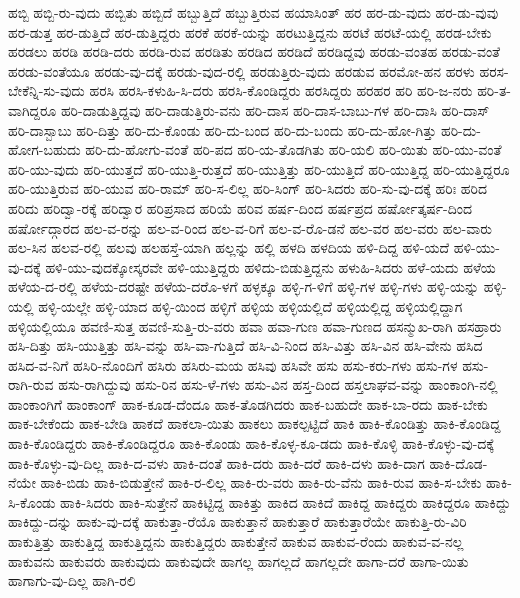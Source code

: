{ಹಬ್ಬಿ
ಹಬ್ಬಿ-ರು-ವುದು
ಹಬ್ಬಿತು
ಹಬ್ಬಿದೆ
ಹಬ್ಬುತ್ತಿದೆ
ಹಬ್ಬುತ್ತಿರುವ
ಹಯಾಸಿಂತ್
ಹರ
ಹರ-ಡು-ವುದು
ಹರ-ಡು-ವುವು
ಹರ-ಡುತ್ತ
ಹರ-ಡುತ್ತಿದೆ
ಹರ-ಡುತ್ತಿದ್ದರು
ಹರಕೆ
ಹರಕೆ-ಯನ್ನು
ಹರಟುತ್ತಿದ್ದನು
ಹರಟೆ
ಹರಟೆ-ಯಲ್ಲಿ
ಹರಡ-ಬೇಕು
ಹರಡಲು
ಹರಡಿ
ಹರಡಿ-ದರು
ಹರಡಿ-ರುವ
ಹರಡಿತು
ಹರಡಿದ
ಹರಡಿದೆ
ಹರಡಿದ್ದವು
ಹರಡು-ವಂತಹ
ಹರಡು-ವಂತೆ
ಹರಡು-ವಂತೆಯೂ
ಹರಡು-ವು-ದಕ್ಕೆ
ಹರಡು-ವುದ-ರಲ್ಲಿ
ಹರಡುತ್ತಿರು-ವುದು
ಹರಡುವ
ಹರಮೋ-ಹನ
ಹರಳು
ಹರಸ-ಬೇಕೆನ್ನಿ-ಸು-ವುದು
ಹರಸಿ
ಹರಸಿ-ಕಳುಹಿ-ಸಿ-ದರು
ಹರಸಿ-ಕೊಂಡಿದ್ದರು
ಹರಸಿದ್ದರು
ಹರಹರ
ಹರಿ
ಹರಿ-ಜ-ನರು
ಹರಿ-ತ-ವಾಗಿದ್ದರೂ
ಹರಿ-ದಾಡುತ್ತಿದ್ದವು
ಹರಿ-ದಾಡುತ್ತಿರು-ವನು
ಹರಿ-ದಾಸ
ಹರಿ-ದಾಸ-ಬಾಬು-ಗಳ
ಹರಿ-ದಾಸಿ
ಹರಿ-ದಾಸ್
ಹರಿ-ದಾಸ್ಬಾಬು
ಹರಿ-ದಿತ್ತು
ಹರಿ-ದು-ಕೊಂಡು
ಹರಿ-ದು-ಬಂದ
ಹರಿ-ದು-ಬಂದು
ಹರಿ-ದು-ಹೋ-ಗಿತ್ತು
ಹರಿ-ದು-ಹೋಗ-ಬಹುದು
ಹರಿ-ದು-ಹೋಗು-ವಂತೆ
ಹರಿ-ಪದ
ಹರಿ-ಯ-ತೊಡಗಿತು
ಹರಿ-ಯಲಿ
ಹರಿ-ಯಿತು
ಹರಿ-ಯು-ವಂತೆ
ಹರಿ-ಯು-ವುದು
ಹರಿ-ಯುತ್ತದೆ
ಹರಿ-ಯುತ್ತಿ-ರುತ್ತದೆ
ಹರಿ-ಯುತ್ತಿತ್ತು
ಹರಿ-ಯುತ್ತಿದೆ
ಹರಿ-ಯುತ್ತಿದ್ದ
ಹರಿ-ಯುತ್ತಿದ್ದರೂ
ಹರಿ-ಯುತ್ತಿರುವ
ಹರಿ-ಯುವ
ಹರಿ-ರಾಮ್
ಹರಿ-ಸ-ಲಿಲ್ಲ
ಹರಿ-ಸಿಂಗ್
ಹರಿ-ಸಿದರು
ಹರಿ-ಸು-ವು-ದಕ್ಕೆ
ಹರಿಃ
ಹರಿದ
ಹರಿದು
ಹರಿದ್ವಾ-ರಕ್ಕೆ
ಹರಿದ್ವಾರ
ಹರಿಪ್ರಸಾದ
ಹರಿಯೆ
ಹರಿವ
ಹರ್ಷ-ದಿಂದ
ಹರ್ಷಪ್ರದ
ಹರ್ಷೋತ್ಕರ್ಷ-ದಿಂದ
ಹರ್ಷೋದ್ಗಾರದ
ಹಲ-ವ-ರನ್ನು
ಹಲ-ವ-ರಿಂದ
ಹಲ-ವ-ರಿಗೆ
ಹಲ-ವ-ರೊ-ಡನೆ
ಹಲ-ವರ
ಹಲ-ವರು
ಹಲ-ವಾರು
ಹಲ-ಸಿನ
ಹಲವ-ರಲ್ಲಿ
ಹಲವು
ಹಲಹಸ್ತೆ-ಯಾಗಿ
ಹಲ್ಲನ್ನು
ಹಲ್ಲಿ
ಹಳದಿ
ಹಳದಿಯ
ಹಳಿ-ದಿದ್ದ
ಹಳಿ-ಯದೆ
ಹಳಿ-ಯು-ವು-ದಕ್ಕೆ
ಹಳಿ-ಯು-ವುದಕ್ಕೋಸ್ಕರವೇ
ಹಳಿ-ಯುತ್ತಿದ್ದರು
ಹಳಿದು-ಬಿಡುತ್ತಿದ್ದನು
ಹಳುಹಿ-ಸಿದರು
ಹಳೆ-ಯದು
ಹಳೆಯ
ಹಳೆಯ-ದ-ರಲ್ಲಿ
ಹಳೆಯ-ದರಷ್ಟೇ
ಹಳೆಯ-ದರೊ-ಳಗೆ
ಹಳ್ಳಕ್ಕೂ
ಹಳ್ಳಿ-ಗ-ಳಿಗೆ
ಹಳ್ಳಿ-ಗಳ
ಹಳ್ಳಿ-ಗಳು
ಹಳ್ಳಿ-ಯನ್ನು
ಹಳ್ಳಿ-ಯಲ್ಲಿ
ಹಳ್ಳಿ-ಯಲ್ಲೇ
ಹಳ್ಳಿ-ಯಾದ
ಹಳ್ಳಿ-ಯಿಂದ
ಹಳ್ಳಿಗೆ
ಹಳ್ಳಿಯ
ಹಳ್ಳಿಯಲ್ಲಿದೆ
ಹಳ್ಳಿಯಲ್ಲಿದ್ದ
ಹಳ್ಳಿಯಲ್ಲಿದ್ದಾಗ
ಹಳ್ಳಿಯಲ್ಲಿಯೂ
ಹವಣಿ-ಸುತ್ತ
ಹವಣಿ-ಸುತ್ತಿ-ರು-ವರು
ಹವಾ
ಹವಾ-ಗುಣ
ಹವಾ-ಗುಣದ
ಹಸನ್ಮುಖ-ರಾಗಿ
ಹಸಹ್ರಾರು
ಹಸಿ-ದಿತ್ತು
ಹಸಿ-ಯುತ್ತಿತ್ತು
ಹಸಿ-ವನ್ನು
ಹಸಿ-ವಾ-ಗುತ್ತಿದೆ
ಹಸಿ-ವಿ-ನಿಂದ
ಹಸಿ-ವಿತ್ತು
ಹಸಿ-ವಿನ
ಹಸಿ-ವೇನು
ಹಸಿದ
ಹಸಿದ-ವ-ನಿಗೆ
ಹಸಿರಿ-ನೊಂದಿಗೆ
ಹಸಿರು
ಹಸಿರು-ಮಯ
ಹಸಿವು
ಹಸಿವೇ
ಹಸು
ಹಸು-ಕರು-ಗಳು
ಹಸು-ಗಳ
ಹಸು-ರಾಗಿ-ರುವ
ಹಸು-ರಾಗಿದ್ದುವು
ಹಸು-ರಿನ
ಹಸು-ಳೆ-ಗಳು
ಹಸು-ವಿನ
ಹಸ್ತ-ದಿಂದ
ಹಸ್ತಲಾಘವ-ವನ್ನು
ಹಾಂಕಾಂಗಿ-ನಲ್ಲಿ
ಹಾಂಕಾಂಗಿಗೆ
ಹಾಂಕಾಂಗ್
ಹಾಕ-ಕೂಡ-ದೆಂದೂ
ಹಾಕ-ತೊಡಗಿದರು
ಹಾಕ-ಬಹುದೇ
ಹಾಕ-ಬಾ-ರದು
ಹಾಕ-ಬೇಕು
ಹಾಕ-ಬೇಕೆಂದು
ಹಾಕ-ಬೇಡಿ
ಹಾಕದೆ
ಹಾಕಲಾ-ಯಿತು
ಹಾಕಲು
ಹಾಕಲ್ಪಟ್ಟಿದೆ
ಹಾಕಿ
ಹಾಕಿ-ಕೊಂಡಿತ್ತು
ಹಾಕಿ-ಕೊಂಡಿದ್ದ
ಹಾಕಿ-ಕೊಂಡಿದ್ದರು
ಹಾಕಿ-ಕೊಂಡಿದ್ದರೂ
ಹಾಕಿ-ಕೊಂಡು
ಹಾಕಿ-ಕೊಳ್ಳ-ಕೂ-ಡದು
ಹಾಕಿ-ಕೊಳ್ಳಿ
ಹಾಕಿ-ಕೊಳ್ಳು-ವು-ದಕ್ಕೆ
ಹಾಕಿ-ಕೊಳ್ಳು-ವು-ದಿಲ್ಲ
ಹಾಕಿ-ದ-ವಳು
ಹಾಕಿ-ದಂತೆ
ಹಾಕಿ-ದರು
ಹಾಕಿ-ದರೆ
ಹಾಕಿ-ದಳು
ಹಾಕಿ-ದಾಗ
ಹಾಕಿ-ದೊಡ-ನೆಯೇ
ಹಾಕಿ-ಬಿಡು
ಹಾಕಿ-ಬಿಡುತ್ತೇನೆ
ಹಾಕಿ-ರ-ಲಿಲ್ಲ
ಹಾಕಿ-ರು-ವರು
ಹಾಕಿ-ರು-ವೆನು
ಹಾಕಿ-ರುವ
ಹಾಕಿ-ಸ-ಬೇಕು
ಹಾಕಿ-ಸಿ-ಕೊಂಡು
ಹಾಕಿ-ಸಿದರು
ಹಾಕಿ-ಸುತ್ತೇನೆ
ಹಾಕಿಟ್ಟಿದ್ದ
ಹಾಕಿತ್ತು
ಹಾಕಿದ
ಹಾಕಿದೆ
ಹಾಕಿದ್ದ
ಹಾಕಿದ್ದರು
ಹಾಕಿದ್ದರೂ
ಹಾಕಿದ್ದು
ಹಾಕಿದ್ದು-ದನ್ನು
ಹಾಕು-ವು-ದಕ್ಕೆ
ಹಾಕುತ್ತಾ-ರೆಯೊ
ಹಾಕುತ್ತಾನೆ
ಹಾಕುತ್ತಾರೆ
ಹಾಕುತ್ತಾರೆಯೇ
ಹಾಕುತ್ತಿ-ರು-ವಿರಿ
ಹಾಕುತ್ತಿತ್ತು
ಹಾಕುತ್ತಿದ್ದ
ಹಾಕುತ್ತಿದ್ದನು
ಹಾಕುತ್ತಿದ್ದರು
ಹಾಕುತ್ತೇನೆ
ಹಾಕುವ
ಹಾಕುವ-ರೆಂದು
ಹಾಕುವ-ವ-ನಲ್ಲ
ಹಾಕುವನು
ಹಾಕುವರು
ಹಾಕುವುದು
ಹಾಕುವುದೇ
ಹಾಗಲ್ಲ
ಹಾಗಲ್ಲದೆ
ಹಾಗಲ್ಲದೇ
ಹಾಗಾ-ದರೆ
ಹಾಗಾ-ಯಿತು
ಹಾಗಾಗು-ವು-ದಿಲ್ಲ
ಹಾಗಿ-ರಲಿ
}
